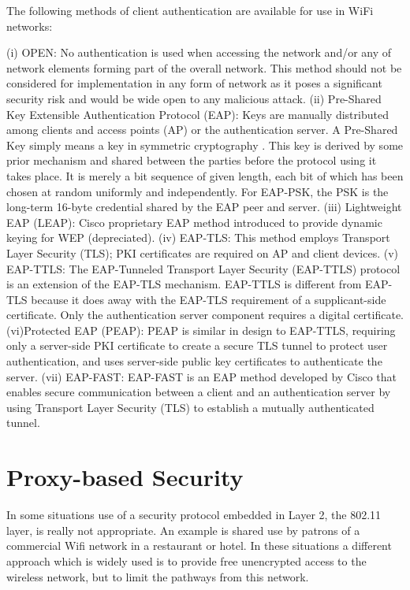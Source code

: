 The following methods of client authentication are available for use in WiFi networks:

(i) OPEN: No authentication is used when accessing the network and/or any of network elements forming part of the overall network. This method should not be considered for implementation in any form of network as it poses a significant security risk and would be wide open to any malicious attack.
(ii) Pre-Shared Key Extensible Authentication Protocol (EAP): Keys are manually distributed among clients and access points (AP) or the authentication server. A Pre-Shared Key simply means a key in symmetric cryptography \cite{EAP_PSK}.  This key is derived by some prior mechanism and shared between the parties before the protocol using it takes place.  It is merely a bit sequence of given length, each bit of which has been chosen at random uniformly and independently.  For EAP-PSK, the PSK is the long-term 16-byte credential shared by the EAP peer and server.
(iii) Lightweight EAP (LEAP): Cisco proprietary EAP method introduced to provide dynamic keying for WEP (depreciated).
(iv) EAP-TLS: This method employs Transport Layer Security (TLS); PKI certificates are required on AP and client devices.
(v) EAP-TTLS: The EAP-Tunneled Transport Layer Security (EAP-TTLS) protocol is an extension of the EAP-TLS mechanism. EAP-TTLS is different from EAP-TLS because it does away with the EAP-TLS requirement of a supplicant-side certificate. Only the authentication server component requires a digital certificate.
(vi)Protected EAP (PEAP): PEAP is similar in design to EAP-TTLS, requiring only a server-side PKI certificate to create a secure TLS tunnel to protect user  authentication, and uses server-side public key certificates to authenticate the server.
(vii) EAP-FAST: EAP-FAST is an EAP method developed by Cisco that enables secure communication between a client and an authentication server by using Transport Layer Security (TLS) to establish a mutually authenticated tunnel.


\section{Proxy-based Security}

In some situations use of a security protocol embedded in Layer 2, the 802.11 layer, is really not appropriate. An example is shared use by patrons of a commercial Wifi network in a restaurant or hotel. In these situations a different approach which is widely used is to provide free unencrypted access to the wireless network, but to limit the pathways from this network.

